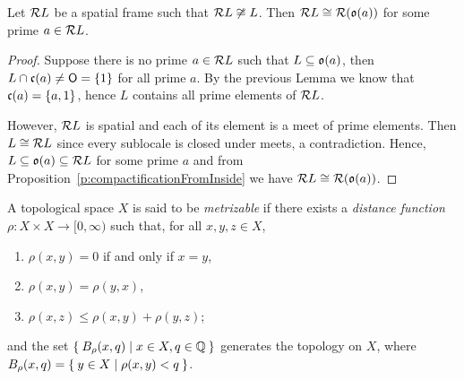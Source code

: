 \begin{proposition}\label{p:spatialCompactifAndPrime}
    Let $\mathcal{R} L$ be a spatial frame such that $\mathcal{R} L\not\cong L$. Then $\mathcal{R} L\cong \mathcal{R}(\mathfrak{o}(a))$ for some prime $a\in \mathcal{R} L$.
\end{proposition}
\begin{proof}
    Suppose there is no prime $a\in\mathcal{R} L$ such that $L\subseteq \mathfrak{o}(a)$, then $L\cap \mathfrak{c}(a)\neq \mathsf{O} = \{1\}$ for all prime $a$. By the previous Lemma we know that $\mathfrak{c}(a) = \{a,1\}$, hence $L$ contains all prime elements of $\mathcal{R} L$.

    However, $\mathcal{R} L$ is spatial and each of its element is a meet of prime elements. Then $L\cong \mathcal{R} L$ since every sublocale is closed under meets, a contradiction. Hence, $L\subseteq \mathfrak{o}(a)\subseteq \mathcal{R} L$ for some prime $a$ and from Proposition~\ref{p:compactificationFromInside} we have $\mathcal{R} L\cong \mathcal{R}(\mathfrak{o}(a))$.
\end{proof}

\begin{definition}
    A topological space $X$ is said to be \emph{metrizable} if there exists a \emph{distance function} $\rho\colon X\times X\to [0,\infty)$ such that, for all $x,y,z\in X$,
    \begin{enumerate}[(M1)]
        \item $\rho(x,y) = 0$ if and only if $x = y$,
        \item $\rho(x,y) = \rho(y,x)$,
        \item $\rho(x,z) \leq \rho(x,y) + \rho(y,z)$;
    \end{enumerate}

    \noindent and the set $\Set{ B_\rho(x,q) | x\in X, q\in \mathbb Q}$ generates the topology on $X$, where $B_\rho(x,q) = \Set{ y \in X | \rho(x,y) < q}$.
\end{definition}

